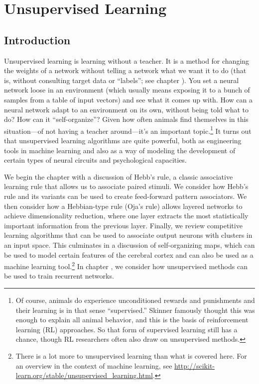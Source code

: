 \chapter{Unsupervised Learning}\label{ch_unsupervised}

\section{Introduction}


Unsupervised learning is learning without a teacher. It is a method for changing the weights of a network without telling a network what we want it to do (that is, without consulting target data or ``labels''; see chapter ). You set a neural network loose in an environment (which usually means exposing it to a bunch of samples from a table of input vectors) and see what it comes up with. How can a neural network adapt to an environment on its own, without being told what to do?  How can it ``self-organize''? Given how often animals find themselves in this situation---of not having a teacher around---it's an important topic.\footnote{Of course, animals do experience unconditioned rewards and punishments and their learning is in that sense ``supervised.'' Skinner famously thought this was enough to explain all animal behavior, and this is the basis of reinforcement learning (RL) approaches. So that form of supervised learning still has a chance, though RL researchers often also draw on unsupervised methods.} It turns out that unsupervised learning algorithms are quite powerful, both as engineering tools in machine learning and also as a way of modeling the development of certain types of neural circuits and psychological capacities.

We begin the chapter with a discussion of Hebb's rule, a classic associative learning rule that allows us to associate paired stimuli. We consider how Hebb's rule and its variants can be used to create feed-forward pattern associators. We then consider how a Hebbian-type rule (Oja's rule) allows layered networks to achieve dimensionality reduction, where one layer extracts the most statistically important information from the previous layer. Finally, we review competitive learning algorithms that can be used to associate output neurons with clusters in an input space. This culminates in a discussion of self-organizing maps, which can be used to model certain features of the cerebral cortex and can also be used as a machine learning tool.\footnote{There is a lot more to unsupervised learning than what is covered here. For an overview in the context of machine learning, see \url{http://scikit-learn.org/stable/unsupervised_learning.html}.}  In chapter , we consider how unsupervised methods can be used to train recurrent networks.

